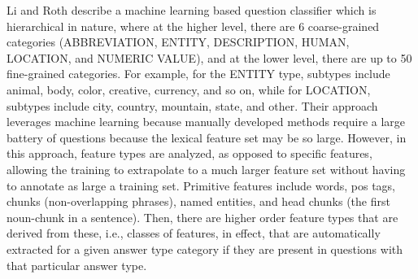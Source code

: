 Li and Roth \cite{li2002learning} describe a machine learning based question classifier which is hierarchical in nature, where at the higher level, there are 6 coarse-grained categories (ABBREVIATION, ENTITY, DESCRIPTION, HUMAN, LOCATION, and NUMERIC VALUE), and at the lower level, there are up to 50 fine-grained categories.  For example, for the ENTITY type, subtypes include animal, body, color, creative, currency, and so on, while for LOCATION, subtypes include city, country, mountain, state, and other.  Their approach leverages machine learning because manually developed methods require a large battery of questions because the lexical feature set may be so large.  However, in this approach, feature types are analyzed, as opposed to specific features, allowing the training to extrapolate to a much larger feature set without having to annotate as large a training set.  Primitive features include words, pos tags, chunks (non-overlapping phrases),  named entities, and head chunks (the first noun-chunk in a sentence).   Then, there are higher order feature types that are derived from these, i.e., classes of features, in effect, that are automatically extracted for a given answer type category if they are present in questions with that particular answer type.










